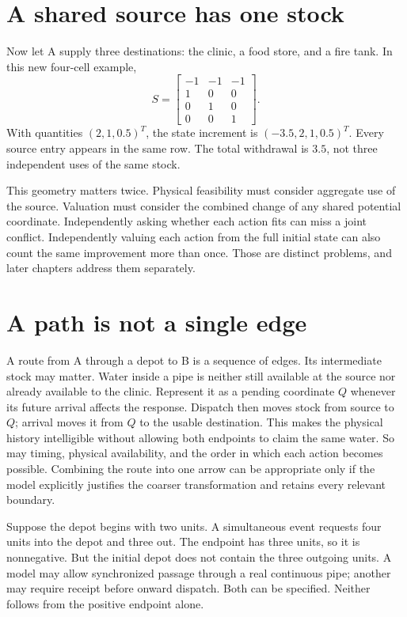 \section{A shared source has one stock}
Now let A supply three destinations: the clinic, a food store, and a fire tank. In this new four-cell example,
\begin{equation}
 S=\begin{bmatrix}-1&-1&-1\\1&0&0\\0&1&0\\0&0&1\end{bmatrix}.
\end{equation}
With quantities \((2,1,0.5)^T\), the state increment is \((-3.5,2,1,0.5)^T\). Every source entry appears in the same row. The total withdrawal is \(3.5\), not three independent uses of the same stock.

This geometry matters twice. Physical feasibility must consider aggregate use of the source. Valuation must consider the combined change of any shared potential coordinate. Independently asking whether each action fits can miss a joint conflict. Independently valuing each action from the full initial state can also count the same improvement more than once. Those are distinct problems, and later chapters address them separately.

\section{A path is not a single edge}
A route from A through a depot to B is a sequence of edges. Its intermediate stock may matter. Water inside a pipe is neither still available at the source nor already available to the clinic. Represent it as a pending coordinate $Q$ whenever its future arrival affects the response. Dispatch then moves stock from source to $Q$; arrival moves it from $Q$ to the usable destination. This makes the physical history intelligible without allowing both endpoints to claim the same water. So may timing, physical availability, and the order in which each action becomes possible. Combining the route into one arrow can be appropriate only if the model explicitly justifies the coarser transformation and retains every relevant boundary.

Suppose the depot begins with two units. A simultaneous event requests four units into the depot and three out. The endpoint has three units, so it is nonnegative. But the initial depot does not contain the three outgoing units. A model may allow synchronized passage through a real continuous pipe; another may require receipt before onward dispatch. Both can be specified. Neither follows from the positive endpoint alone.

